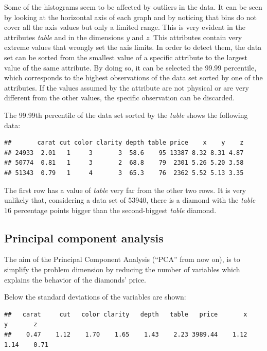 \documentclass[
]{article}
\begin{document}
Some of the histograms seem to be affected by outliers in the data. It
can be seen by looking at the horizontal axis of each graph and by
noticing that bins do not cover all the axis values but only a limited
range. This is very evident in the attributes \emph{table} and in the
dimensions \emph{y} and \emph{z}. This attributes contain very extreme
values that wrongly set the axis limits. In order to detect them, the
data set can be sorted from the smallest value of a specific attribute
to the largest value of the same attribute. By doing so, it can be
selected the 99.99 percentile, which corresponds to the highest
observations of the data set sorted by one of the attributes. If the
values assumed by the attribute are not physical or are very different
from the other values, the specific observation can be discarded.

The 99.99th percentile of the data set sorted by the \emph{table} shows
the following data:

\begin{verbatim}
##       carat cut color clarity depth table price    x    y    z
## 24933  2.01   1     3       3  58.6    95 13387 8.32 8.31 4.87
## 50774  0.81   1     3       2  68.8    79  2301 5.26 5.20 3.58
## 51343  0.79   1     4       3  65.3    76  2362 5.52 5.13 3.35
\end{verbatim}

The first row has a value of \emph{table} very far from the other two
rows. It is very unlikely that, considering a data set of 53940, there
is a diamond with the \emph{table} 16 percentage points bigger than the
second-biggest \emph{table} diamond.

\hypertarget{principal-component-analysis}{%
\subsection{Principal component
analysis}\label{principal-component-analysis}}

The aim of the Principal Component Analysis (``PCA'' from now on), is to
simplify the problem dimension by reducing the number of variables which
explains the behavior of the diamonds' price.

Below the standard deviations of the variables are shown:

\begin{verbatim}
##   carat     cut   color clarity   depth   table   price       x       y       z 
##    0.47    1.12    1.70    1.65    1.43    2.23 3989.44    1.12    1.14    0.71
\end{verbatim}
\end{document}
